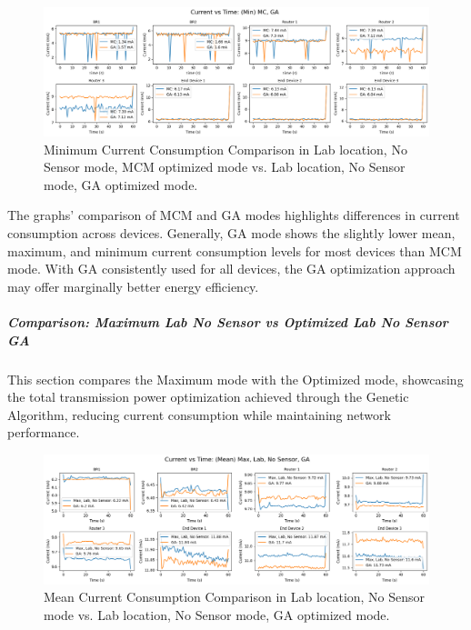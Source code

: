 \begin{figure}[H]
  \centering
  \includegraphics[width=1\textwidth]{images/research_results/current_consumption_analysis/optimized/lab/no_sensor/ga/comparison/min_comparison_lab_no-sensor_mc_vs_lab_no-sensor_ga.png}
    \caption{Minimum Current Consumption Comparison in Lab location, No Sensor mode, MCM optimized mode vs. Lab location, No Sensor mode, GA optimized mode.}
    \label{fig:min_comparison_lab_no-sensor_mc_vs_lab_no-sensor_ga}
\end{figure}

The graphs' comparison of MCM and GA modes highlights differences in current consumption across devices. Generally, GA mode shows the slightly lower mean, maximum, and minimum current consumption levels for most devices than MCM mode. With GA consistently used for all devices, the GA optimization approach may offer marginally better energy efficiency.

\subparagraph{Comparison: Maximum Lab No Sensor vs Optimized Lab No Sensor GA}
This section compares the Maximum mode with the Optimized mode, showcasing the total transmission power optimization achieved through the Genetic Algorithm, reducing current consumption while maintaining network performance.

\begin{figure}[H]
  \centering
  \includegraphics[width=1\textwidth]{images/research_results/current_consumption_analysis/optimized/lab/no_sensor/ga/comparison/mean_comparison_lab_no-sensor_vs_lab_no-sensor_ga.png}
    \caption{Mean Current Consumption Comparison in Lab location, No Sensor mode vs. Lab location, No Sensor mode, GA optimized mode.}
    \label{fig:mean_comparison_lab_no-sensor_vs_lab_no-sensor_ga}
\end{figure}

